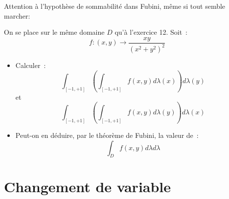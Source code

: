 Attention à l'hypothèse de sommabilité dans Fubini, m\^eme si tout semble
marcher:
\begin{exercice}
On se place sur le même domaine $D$ qu'à l'exercice 12. Soit~:
\[
f : (x,y) \to \frac{xy}{(x^2+y^2)^2}
\]
\begin{itemize}
\item Calculer~:
\[
\int_{[-1,+1]} \left ( \int_{[-1,+1]} f(x,y) d \lambda(x) \right )
d \lambda(y)
\]
et
\[
\int_{[-1,+1]} \left ( \int_{[-1,+1]} f(x,y) d \lambda(y) \right )
d \lambda(x)
\]
\item Peut-on en déduire, par le théorème de Fubini, la valeur de~:
\[
\int_D f(x,y) d \lambda d \lambda
\]
\end{itemize}
\end{exercice}

\section{Changement de variable}

